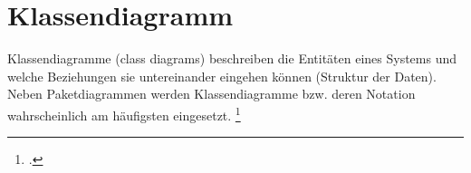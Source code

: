 \documentclass{lehramt-informatik-haupt}
\begin{document}

\chapter{Klassendiagramm}

\begin{quellen}
\item \cite[Seite 108-169]{rupp}
\item \cite[Zusammengefügtes PDF Seite 30-32 / Kapitel „Klassen“ 8-10]{brinda}
\item \cite{wiki:klassendiagramm}
\end{quellen}

Klassendiagramme (class diagrams) beschreiben die Entitäten eines
Systems und welche Beziehungen sie untereinander eingehen können
(Struktur der Daten). Neben Paketdiagrammen werden Klassendiagramme bzw.
deren Notation wahrscheinlich am häufigsten eingesetzt.
\footcite[Seite 166]{schatten}
\end{document}
